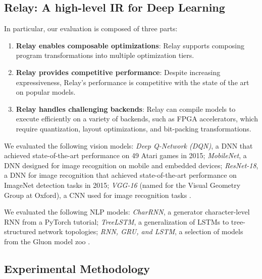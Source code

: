 \subsection{Relay: A high-level IR for Deep Learning}
  In particular, our evaluation is composed of three parts:
  \begin{enumerate}
    \item \textbf{Relay enables composable optimizations}: Relay
      supports composing program transformations into multiple optimization tiers.
    \item \textbf{Relay provides competitive performance}: Despite increasing
      expressiveness, Relay's performance is competitive with the
      state of the art on popular models.
    \item \textbf{Relay handles challenging backends}: Relay can compile
      models to execute efficiently on a variety of
      backends, such as FPGA accelerators, which require quantization, layout
      optimizations, and bit-packing transformations.
  \end{enumerate}

  We evaluated the following vision models:
    \textit{Deep Q-Network (DQN)}, a DNN that achieved state-of-the-art performance
    on 49 Atari games in 2015;
    \textit{MobileNet}, a DNN designed for image recognition on mobile and
    embedded devices;
    \textit{ResNet-18}, a DNN for image recognition that achieved state-of-the-art
    performance on ImageNet detection tasks in 2015;
    \textit{VGG-16} (named for the Visual Geometry Group
    at Oxford), a CNN used for image recognition tasks
    \citep{dqn, mobilenet, resnet, vgg}.

  We evaluated the following NLP models:
    \textit{CharRNN}, a generator character-level
    RNN from a PyTorch tutorial;
    \textit{TreeLSTM}, a generalization of LSTMs to
    tree-structured network topologies;
    \textit{RNN, GRU, and LSTM}, a selection of models from the Gluon
    model zoo
    \citep{pytorch_rnn_tut, tree_lstm, gluon_model_zoo}.

  \subsection{Experimental Methodology}

